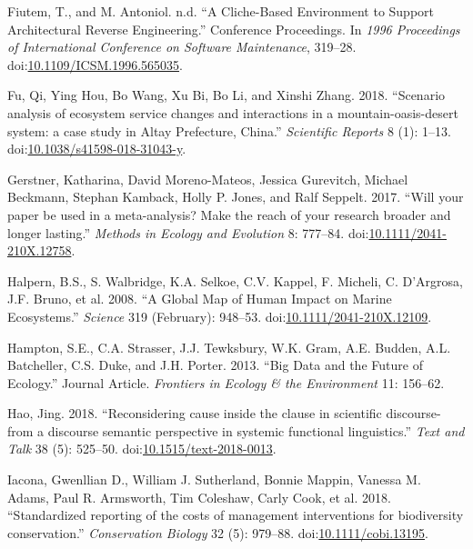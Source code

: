 \documentclass[fleqn,10pt]{wlpeerj} %
\begin{document}
\hypertarget{ref-Fiutem1996}{}
Fiutem, T., and M. Antoniol. n.d. ``A Cliche-Based Environment to
Support Architectural Reverse Engineering.'' Conference Proceedings. In
\emph{1996 Proceedings of International Conference on Software
Maintenance}, 319--28.
doi:\href{https://doi.org/10.1109/ICSM.1996.565035}{10.1109/ICSM.1996.565035}.

\hypertarget{ref-Fu2018}{}
Fu, Qi, Ying Hou, Bo Wang, Xu Bi, Bo Li, and Xinshi Zhang. 2018.
``Scenario analysis of ecosystem service changes and interactions in a
mountain-oasis-desert system: a case study in Altay Prefecture, China.''
\emph{Scientific Reports} 8 (1): 1--13.
doi:\href{https://doi.org/10.1038/s41598-018-31043-y}{10.1038/s41598-018-31043-y}.

\hypertarget{ref-Gerstner2017}{}
Gerstner, Katharina, David Moreno-Mateos, Jessica Gurevitch, Michael
Beckmann, Stephan Kamback, Holly P. Jones, and Ralf Seppelt. 2017.
``Will your paper be used in a meta-analysis? Make the reach of your
research broader and longer lasting.'' \emph{Methods in Ecology and
Evolution} 8: 777--84.
doi:\href{https://doi.org/10.1111/2041-210X.12758}{10.1111/2041-210X.12758}.

\hypertarget{ref-Halpern2008}{}
Halpern, B.S., S. Walbridge, K.A. Selkoe, C.V. Kappel, F. Micheli, C.
D'Argrosa, J.F. Bruno, et al. 2008. ``A Global Map of Human Impact on
Marine Ecosystems.'' \emph{Science} 319 (February): 948--53.
doi:\href{https://doi.org/10.1111/2041-210X.12109}{10.1111/2041-210X.12109}.

\hypertarget{ref-Hampton2013}{}
Hampton, S.E., C.A. Strasser, J.J. Tewksbury, W.K. Gram, A.E. Budden,
A.L. Batcheller, C.S. Duke, and J.H. Porter. 2013. ``Big Data and the
Future of Ecology.'' Journal Article. \emph{Frontiers in Ecology \& the
Environment} 11: 156--62.

\hypertarget{ref-Hao2018}{}
Hao, Jing. 2018. ``Reconsidering cause inside the clause in scientific
discourse-from a discourse semantic perspective in systemic functional
linguistics.'' \emph{Text and Talk} 38 (5): 525--50.
doi:\href{https://doi.org/10.1515/text-2018-0013}{10.1515/text-2018-0013}.

\hypertarget{ref-Iacona2018}{}
Iacona, Gwenllian D., William J. Sutherland, Bonnie Mappin, Vanessa M.
Adams, Paul R. Armsworth, Tim Coleshaw, Carly Cook, et al. 2018.
``Standardized reporting of the costs of management interventions for
biodiversity conservation.'' \emph{Conservation Biology} 32 (5):
979--88.
doi:\href{https://doi.org/10.1111/cobi.13195}{10.1111/cobi.13195}.
\end{document}
